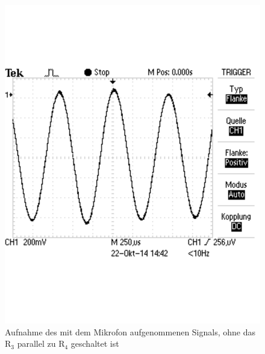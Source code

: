 \documentclass[12pt,a4paper]{article}
\begin{document}
\begin{figure}[H] 
  \centering
    \includegraphics[scale = 0.4]{2_3_r3np_sig.pdf}
  	\caption[Aufnahme des mit dem Mikrofon aufgenommenen Signals, ohne das R$_3$ parallel zu R$_4$ geschaltet ist]{Aufnahme des mit dem Mikrofon aufgenommenen Signals, ohne das R$_3$ parallel zu R$_4$ geschaltet ist}
  \label{fig:2_3_r3np_sig}
\end{figure}
\end{document}

